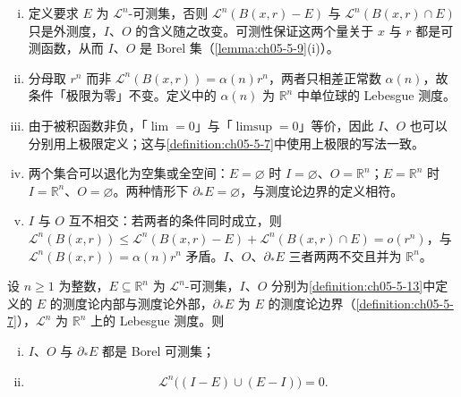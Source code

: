 \documentclass[../../main.tex]{subfiles}%
\begin{document}
\begin{remark}\label{remark:ch05-def-5-13-条件}
\begin{enumerate}[(i)]
\item 定义要求 $E$ 为 $\mathcal{L}^n$-可测集，否则 $\mathcal{L}^n(B(x,r)-E)$ 与 $\mathcal{L}^n(B(x,r)\cap E)$ 只是外测度，$I$、$O$ 的含义随之改变。可测性保证这两个量关于 $x$ 与 $r$ 都是可测函数，从而 $I$、$O$ 是 Borel 集（\cref{lemma:ch05-5-9}(i)）。%
\item 分母取 $r^n$ 而非 $\mathcal{L}^n(B(x,r))=\alpha(n)r^n$，两者只相差正常数 $\alpha(n)$，故条件「极限为零」不变。定义中的 $\alpha(n)$ 为 $\mathbb{R}^n$ 中单位球的 Lebesgue 测度。
\item 由于被积函数非负，「$\lim=0$」与「$\limsup=0$」等价，因此 $I$、$O$ 也可以分别用上极限定义；这与\cref{definition:ch05-5-7}中使用上极限的写法一致。%
\item 两个集合可以退化为空集或全空间：$E=\varnothing$ 时 $I=\varnothing$、$O=\mathbb{R}^n$；$E=\mathbb{R}^n$ 时 $I=\mathbb{R}^n$、$O=\varnothing$。两种情形下 $\partial_*E=\varnothing$，与测度论边界的定义相符。
\item $I$ 与 $O$ 互不相交：若两者的条件同时成立，则 $\mathcal{L}^n(B(x,r))\leqslant\mathcal{L}^n(B(x,r)-E)+\mathcal{L}^n(B(x,r)\cap E)=o(r^n)$，与 $\mathcal{L}^n(B(x,r))=\alpha(n)r^n$ 矛盾。$I$、$O$、$\partial_*E$ 三者两两不交且并为 $\mathbb{R}^n$。
\end{enumerate}
\end{remark}

\begin{lemma}\label{lemma:ch05-5-9}
设 $n\geqslant1$ 为整数，$E\subseteq\mathbb{R}^n$ 为 $\mathcal{L}^n$-可测集，$I$、$O$ 分别为\cref{definition:ch05-5-13}中定义的 $E$ 的测度论内部与测度论外部，$\partial_*E$ 为 $E$ 的测度论边界（\cref{definition:ch05-5-7}），$\mathcal{L}^n$ 为 $\mathbb{R}^n$ 上的 Lebesgue 测度。则 %
\begin{enumerate}[(i)]
\item $I$、$O$ 与 $\partial_*E$ 都是 Borel 可测集；
\item
\begin{align*}
\mathcal{L}^n\bigl((I-E)\cup(E-I)\bigr)=0 .
\end{align*}
\end{enumerate}
\end{lemma}
\end{document}
